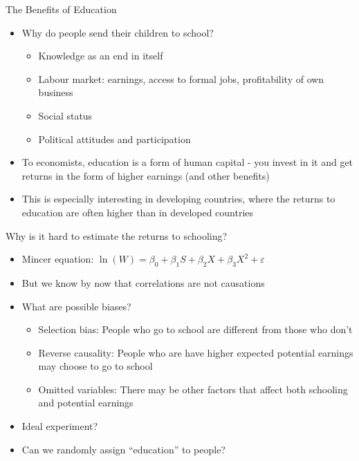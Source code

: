 \documentclass[11pt,notes=hide,aspectratio=169,mathserif]{beamer}
\begin{document}
\begin{frame}{The Benefits of Education}
\begin{itemize}
\item Why do people send their children to school?
 \begin{itemize}
     \item  Knowledge as an end in itself
     \item  Labour market: earnings, access to formal jobs, profitability of own business
      \item  Social status
     \item  Political attitudes and participation
\end{itemize}
 \item  To economists, education is a form of human capital - you invest in it and get returns in the form of higher earnings (and other benefits)
 \item  This is especially interesting in developing countries, where the returns to education are often higher than in developed countries
\end{itemize}
\end{frame}

\begin{frame}{Why is it hard to estimate the returns to schooling?}
\begin{itemize}
\item Mincer equation: $\ln(W) = \beta_0 + \beta_1 S + \beta_2 X + \beta_3 X^2 + \varepsilon$
 \item But we know by now that correlations are not causations
 \item What are possible biases? 
\begin{itemize}
     \item  Selection bias: People who go to school are different from those who don't
     \item  Reverse causality: People who are have higher expected potential earnings may choose to go to school 
     \item  Omitted variables: There may be other factors that affect both schooling and potential earnings
\end{itemize}
 \item  Ideal experiment?
 \item  Can we randomly assign ``education'' to people? 
\end{itemize}
\end{frame}
\end{document}
